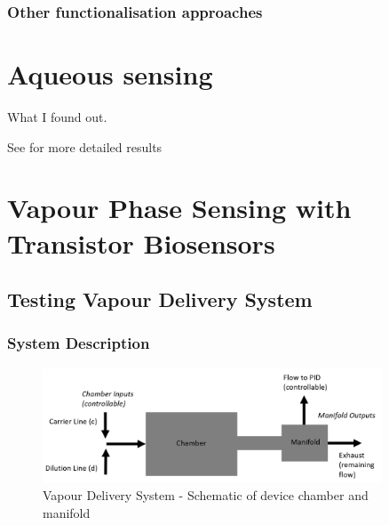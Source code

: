 \documentclass[
  a4paper,
]{scrbook}
\begin{document}
\hypertarget{other-functionalisation-approaches}{%
\subsection{Other functionalisation
approaches}\label{other-functionalisation-approaches}}


\hypertarget{aqueous-sensing}{%
\chapter{Aqueous sensing}\label{aqueous-sensing}}

What I found out.

See for more detailed results


\hypertarget{vapour-phase-sensing-with-transistor-biosensors}{%
\chapter{Vapour Phase Sensing with Transistor
Biosensors}\label{vapour-phase-sensing-with-transistor-biosensors}}

\hypertarget{testing-vapour-delivery-system}{%
\section{Testing Vapour Delivery
System}\label{testing-vapour-delivery-system}}

\hypertarget{system-description}{%
\subsection{System Description}\label{system-description}}

\begin{figure}

{\centering \includegraphics[width=0.9\textwidth,height=\textheight]{./figures/ch7/chamber-manifold.png}

}

\caption{Vapour Delivery System - Schematic of device chamber and
manifold}

\end{figure}
\end{document}
